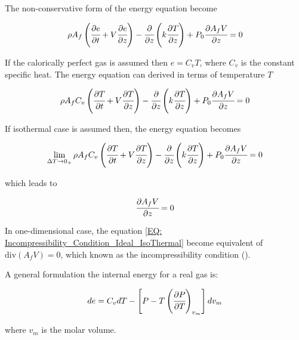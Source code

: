 \documentclass[../Article_Model_Parameters.tex]{subfiles}
\begin{document}
	The non-conservative form of the energy equation become
	
	{\footnotesize
		\begin{equation*}
		\rho A_f \left( \cfrac{\partial e }{\partial t} + V \cfrac{\partial e}{\partial z} \right) - \cfrac{\partial}{\partial z} \left( k \cfrac{\partial T}{\partial z} \right) + P_0 \cfrac{\partial A_f V}{\partial z} = 0
		\end{equation*}
	}
	
	If the calorically perfect gas is assumed then $e=C_vT$, where $C_v$ is the constant specific heat. The energy equation can derived in terms of temperature $T$
	
	{\footnotesize
		\begin{equation*}
			\rho A_f C_v \left( \cfrac{\partial T }{\partial t} + V \cfrac{\partial T}{\partial z} \right) - \cfrac{\partial}{\partial z} \left( k \cfrac{\partial T}{\partial z} \right) + P_0 \cfrac{\partial A_f V}{\partial z} = 0
		\end{equation*}
	}
	
	If isothermal case is assumed then, the energy equation becomes
	
	{\footnotesize
		\begin{equation*}
			\lim_{\Delta T \rightarrow 0_+} \rho A_f C_v \left( \cfrac{\partial T }{\partial t} + V \cfrac{\partial T}{\partial z} \right) - \cfrac{\partial}{\partial z} \left( k \cfrac{\partial T}{\partial z} \right) + P_0 \cfrac{\partial A_f V}{\partial z} = 0
		\end{equation*}
	}
	
	which leads to
	
	{\footnotesize
		\begin{equation}
			\cfrac{\partial A_f V}{\partial z} = 0
			\label{EQ: Incompressibility_Condition_Ideal_IsoThermal}
		\end{equation}
	}
	
	In one-dimensional case, the equation \ref{EQ: Incompressibility_Condition_Ideal_IsoThermal} become equivalent of $\text{div} ( A_f V) = 0$, which known as the incompressibility condition (\citet{Lions2013}). 
	
		A general formulation the internal energy for a real gas is:
	
	{\footnotesize
		\begin{equation*}
			de=C_vdT-\left[P-T\left(\cfrac{\partial P}{\partial T}\right)_{v_m}\right]dv_m
	\end{equation*} }
	
	where $v_m$ is the molar volume.
	
\end{document}
